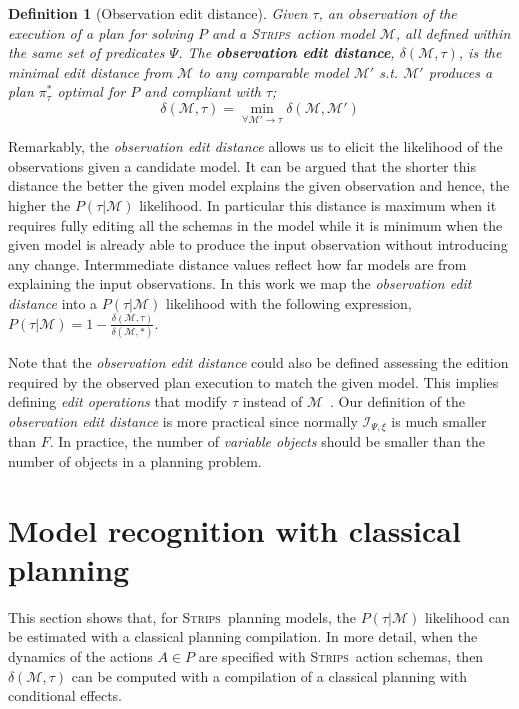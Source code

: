 \documentclass[letterpaper]{article} %
\newcommand{\strips}{\textsc{Strips}}     %
\newtheorem{definition}[theorem]{Definition}
\begin{document}
\begin{definition}[Observation edit distance]
  Given $\tau$, an observation of the execution of a plan for solving $P$ and a \strips\ action model $\mathcal{M}$, all defined within the same set of predicates $\Psi$. The {\bf observation edit distance}, $\delta(\mathcal{M},\tau)$, is the minimal edit distance from $\mathcal{M}$ to any {\em comparable} model $\mathcal{M}'$ s.t. $\mathcal{M}'$ produces a plan $\pi^*_\tau$ optimal for $P$ and compliant with $\tau$; \[\delta(\mathcal{M},\tau)=\min_{\forall \mathcal{M}' \rightarrow \tau} \delta(\mathcal{M},\mathcal{M}')\]
\end{definition}

Remarkably, the {\em observation edit distance} allows us to elicit the likelihood of the observations given a candidate model. It can be argued that the shorter this  distance the better the given model explains the given observation and hence, the higher the $P(\tau|\mathcal{M})$ likelihood. In particular this distance is maximum when it requires fully editing all the schemas in the model while it is minimum when the given model is already able to produce the input observation without introducing any change. Intermmediate distance values reflect how far models are from explaining the input observations. In this work we map the {\em observation edit distance} into a $P(\tau|\mathcal{M})$ likelihood with the following expression, $P(\tau|\mathcal{M}) = 1-\frac{\delta(\mathcal{M},\tau)}{\delta(\mathcal{M},*)}$.

Note that the {\em observation edit distance} could also be defined assessing the edition required by the observed plan execution to match the given model. This implies defining {\em edit operations} that modify $\tau$ instead of $\mathcal{M}$~\cite{sohrabi:precognition:IJCAI2016}. Our definition of the {\em observation edit distance} is more practical since normally ${\mathcal I}_{\Psi,\xi}$ is much smaller than $F$. In practice, the number of {\em variable objects} should be smaller than the number of objects in a planning problem.



\section{Model recognition with classical planning}
This section shows that, for \strips\ planning models, the $P(\tau|\mathcal{M})$ likelihood can be estimated with a classical planning compilation. In more detail, when the dynamics of the actions $A\in P$ are specified with \strips\ action schemas, then $\delta(\mathcal{M},\tau)$ can be computed with a compilation of a classical planning with conditional effects.
\end{document}
